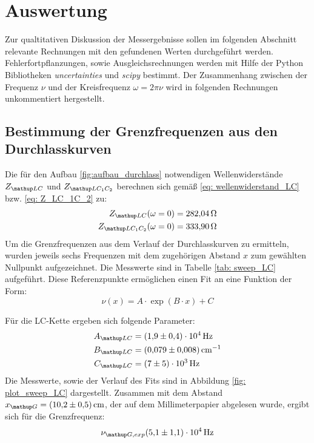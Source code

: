 \section{Auswertung}
Zur qualtitativen Diskussion der Messergebnisse sollen im folgenden Abschnitt relevante Rechnungen mit den gefundenen
Werten durchgeführt werden. Fehlerfortpflanzungen, sowie Ausgleichsrechnungen werden mit
Hilfe der Python Bibliotheken \emph{uncertainties}\cite{uncertainties} und \emph{scipy}\cite{scipy} bestimmt. Der Zusammenhang zwischen
der Frequenz $\nu$ und der Kreisfrequenz $\omega = 2\pi\nu$ wird in folgenden Rechnungen unkommentiert hergestellt.
\subsection{Bestimmung der Grenzfrequenzen aus den Durchlasskurven}
Die für den Aufbau \ref{fig:aufbau_durchlass} notwendigen Wellenwiderstände $Z\ua{LC}$ und $Z\ua{LC_1C_2}$ berechnen sich gemäß \eqref{eq: wellenwiderstand_LC} bzw. \eqref{eq: Z_LC_1C_2} zu:
\begin{align}
  Z\ua{LC}(\omega=0) &= \SI{282.04}{\ohm}\\
  Z\ua{LC_1C_2}(\omega=0) &= \SI{333.90}{\ohm}
  \label{eq: wellenwiderstand_zahlenwert}
\end{align}
Um die Grenzfrequenzen aus dem Verlauf der Durchlasskurven zu ermitteln, wurden jeweils sechs
Frequenzen mit dem zugehörigen Abstand $x$ zum gewählten Nullpunkt aufgezeichnet. Die Messwerte
sind in Tabelle \ref{tab: sweep_LC} aufgeführt. Diese Referenzpunkte ermöglichen einen Fit an eine Funktion der Form:
\begin{equation}
  \nu(x) = A \cdot \exp(B\cdot x) + C
  \label{eq: exp_fit}
\end{equation}
\FloatBarrier

Für die LC-Kette ergeben sich folgende Parameter:
\begin{align}
  \begin{aligned}
    A\ua{LC} &= \SI{1.9(4)e4}{\hertz}\\
    B\ua{LC} &= \SI{0.079(8)}{\cm^{-1}}\\
    C\ua{LC} &= \SI{7(5)e3}{\hertz}
  \end{aligned}
  \label{eq: params_LC}
\end{align}
Die Messwerte, sowie der Verlauf des Fits sind in Abbildung \ref{fig: plot_sweep_LC} dargestellt. Zusammen
mit dem Abstand $x\ua{G} = \SI{10.2(5)}{cm}$, der auf dem Millimeterpapier abgelesen wurde, ergibt sich
für die Grenzfrequenz:
\begin{equation}
  \nu\ua{G, exp}\SI{5.1(11)e4}{\hertz}
  \label{eq: nu_g_LC}
\end{equation}
